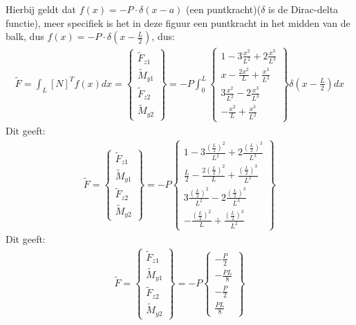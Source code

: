 \documentclass[a4paper,11pt,twoside]{report}
\begin{document}
Hierbij geldt dat $f(x) = -P \cdot \delta(x - a)$ (een puntkracht)($\delta$ is de Dirac-delta
functie), meer specifiek is het in deze figuur een puntkracht in het midden van de balk, dus
$f(x) = -P \cdot \delta(x - \frac{L}{2})$, dus:
\begin{align*}
    \tilde{F} = \int_L^{} [N]^T f(x) dx =
    \begin{Bmatrix}
        \tilde{F}_{z1} \\
        \tilde{M}_{y1} \\
        \tilde{F}_{z2} \\
        \tilde{M}_{y2}
    \end{Bmatrix}
    =
    -P\int_0^L
    \begin{Bmatrix}
        1 - 3 \frac{x^2}{L^2} + 2 \frac{x^3}{L^3} \\
        x - \frac{2x^2}{L} + \frac{x^3}{L^2}      \\
        3 \frac{x^2}{L^2} - 2 \frac{x^3}{L^3}     \\
        -\frac{x^2}{L} + \frac{x^3}{L^2}
    \end{Bmatrix}
    \delta(x - \frac{L}{2}) dx
\end{align*}
Dit geeft:
\begin{align*}
    \tilde{F} =
    \begin{Bmatrix}
        \tilde{F}_{z1} \\
        \tilde{M}_{y1} \\
        \tilde{F}_{z2} \\
        \tilde{M}_{y2}
    \end{Bmatrix}
    =
    -P
    \begin{Bmatrix}
        1 - 3 \frac{\left(\frac{L}{2}\right)^2}{L^2} + 2 \frac{\left(\frac{L}{2}\right)^3}{L^3}      \\
        \frac{L}{2} - \frac{2\left(\frac{L}{2}\right)^2}{L} + \frac{\left(\frac{L}{2}\right)^3}{L^2} \\
        3 \frac{\left(\frac{L}{2}\right)^2}{L^2} - 2 \frac{\left(\frac{L}{2}\right)^3}{L^3}          \\
        -\frac{\left(\frac{L}{2}\right)^2}{L} + \frac{\left(\frac{L}{2}\right)^3}{L^2}
    \end{Bmatrix}
\end{align*}
Dit geeft:
\begin{align*}
    \tilde{F} =
    \begin{Bmatrix}
        \tilde{F}_{z1} \\
        \tilde{M}_{y1} \\
        \tilde{F}_{z2} \\
        \tilde{M}_{y2}
    \end{Bmatrix}
    =
    -P
    \begin{Bmatrix}
        -\frac{P}{2}  \\
        -\frac{PL}{8} \\
        -\frac{P}{2}  \\
        \frac{PL}{8}
    \end{Bmatrix}
\end{align*}
\end{document}
